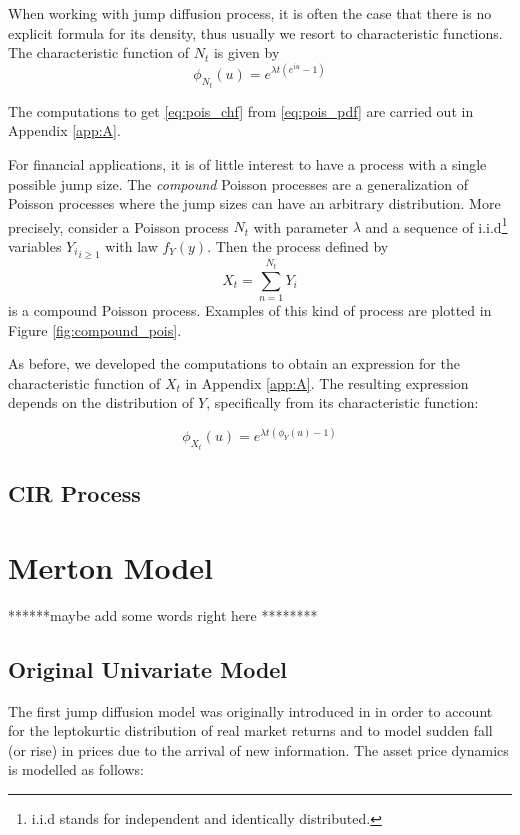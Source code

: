 When working with jump diffusion process, it is often the case that there is no explicit formula for its density, thus usually we resort to characteristic functions. The characteristic function of $N_t$ is given by 
\begin{equation}
\label{eq:pois_chf}
	\phi_{N_t}(u)=e^{\lambda t (e^{iu}-1)}
\end{equation}

The computations to get \ref{eq:pois_chf} from \ref{eq:pois_pdf} are carried out in Appendix \ref{app:A}. 

\bigskip
For financial applications, it is of little interest to have a process with a single possible jump size. The \textit{compound} Poisson processes are a generalization of Poisson processes  where  the jump sizes can have an arbitrary distribution. More precisely, consider a Poisson process $N_t$ with parameter $\lambda$ and a sequence of i.i.d\footnote{i.i.d stands for independent and identically distributed.} variables ${Y_i}_{i\geq 1}$ with law $f_Y(y)$. Then the process defined by
\begin{equation}
	X_t = \sum_{n=1}^{N_t} Y_i
\end{equation}
is a compound Poisson process. Examples of this kind of process are plotted in Figure \cref{fig:compound_pois}.

As before, we developed the computations to obtain an expression for the characteristic function of $X_t$ in Appendix \ref{app:A}. The resulting expression depends on the distribution of $Y$, specifically from its characteristic function:

\begin{equation}
	\phi_{X_t}(u) = e^{\lambda t (\phi_Y(u)-1)}
\end{equation}


\subsection{CIR Process}

\bigskip
\section{Merton Model}

 ******maybe add some words right here ********
\subsection{Original Univariate Model}
The first jump diffusion model was originally introduced in \cite{MERTON1976} in order to account for the leptokurtic distribution of real market returns and to model sudden fall (or rise) in prices due to the arrival of new information.
The asset price dynamics is modelled as follows:

